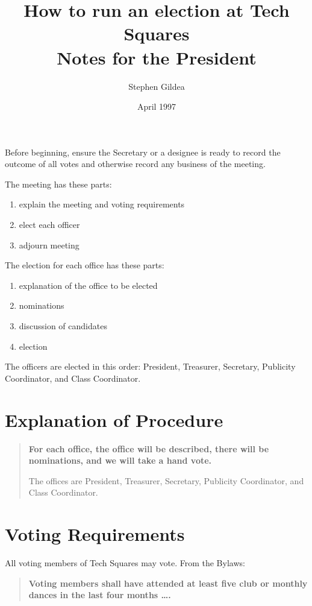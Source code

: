 \documentclass{article}
\title{How to run an election at Tech Squares \\
        \Large Notes for the President}         %
\author{Stephen Gildea}
\date{April 1997}
\newenvironment{chairsays}
               {\parskip 0pt \par %
                \begin{quote}
                 \parskip 0pt \bf}
               {\end{quote}}
\begin{document}

\maketitle

Before beginning, ensure the Secretary or a designee is ready to record
the outcome of all votes and otherwise record any business of the meeting.

The meeting has these parts:
\begin{enumerate}
\setlength{\parskip}{0pt}\setlength{\itemsep}{0pt}
\item
explain the meeting and voting requirements
\item
elect each officer
\item
adjourn meeting
\end{enumerate}

The election for each office has these parts:
\begin{enumerate}
\setlength{\parskip}{0pt}\setlength{\itemsep}{0pt}
\item
explanation of the office to be elected
\item
nominations
\item
discussion of candidates
\item
election
\end{enumerate}

The officers are elected in this order: President, Treasurer,
Secretary, Publicity Coordinator, and Class Coordinator.

\section{Explanation of Procedure}

\begin{chairsays}
For each office, the office will be described, there will be
nominations, and we will take a hand vote.

The offices are
President, Treasurer,
Secretary, Publicity Coordinator, and Class Coordinator.
\end{chairsays}

\section{Voting Requirements}

All voting members of Tech Squares may vote.  From the Bylaws:

\begin{chairsays}
Voting members shall have attended at least five club or monthly dances in
the last four months \ldots .
\end{chairsays}
\end{document}
